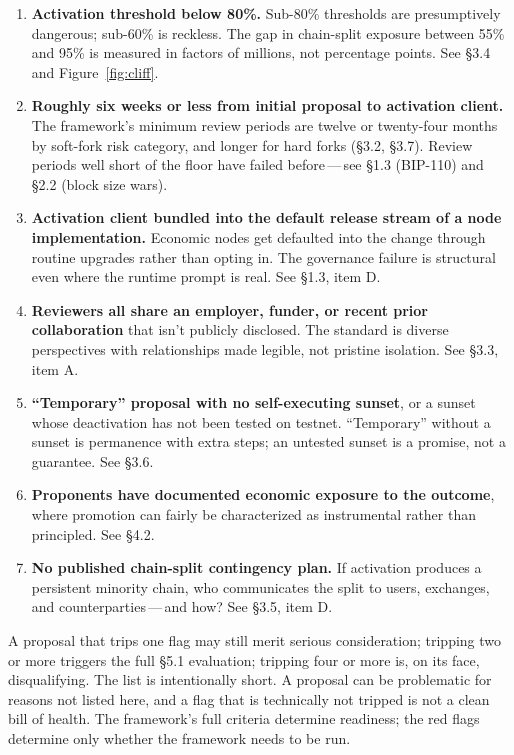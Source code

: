 \documentclass[11pt, twoside, openright]{book}
\newcommand{\sect}[1]{\S#1}
\begin{document}
\begin{enumerate}
  \item \textbf{Activation threshold below 80\%.} Sub-80\% thresholds are presumptively dangerous; sub-60\% is reckless. The gap in chain-split exposure between 55\% and 95\% is measured in factors of millions, not percentage points. See \sect{3.4} and Figure~\ref{fig:cliff}.
  \item \textbf{Roughly six weeks or less from initial proposal to activation client.} The framework's minimum review periods are twelve or twenty-four months by soft-fork risk category, and longer for hard forks (\sect{3.2}, \sect{3.7}). Review periods well short of the floor have failed before\,---\,see \sect{1.3} (BIP-110) and \sect{2.2} (block size wars).
  \item \textbf{Activation client bundled into the default release stream of a node implementation.} Economic nodes get defaulted into the change through routine upgrades rather than opting in. The governance failure is structural even where the runtime prompt is real. See \sect{1.3}, item D.
  \item \textbf{Reviewers all share an employer, funder, or recent prior collaboration} that isn't publicly disclosed. The standard is diverse perspectives with relationships made legible, not pristine isolation. See \sect{3.3}, item A.
  \item \textbf{``Temporary'' proposal with no self-executing sunset}, or a sunset whose deactivation has not been tested on testnet. ``Temporary'' without a sunset is permanence with extra steps; an untested sunset is a promise, not a guarantee. See \sect{3.6}.
  \item \textbf{Proponents have documented economic exposure to the outcome}, where promotion can fairly be characterized as instrumental rather than principled. See \sect{4.2}.
  \item \textbf{No published chain-split contingency plan.} If activation produces a persistent minority chain, who communicates the split to users, exchanges, and counterparties\,---\,and how? See \sect{3.5}, item D.
\end{enumerate}

A proposal that trips one flag may still merit serious consideration; tripping two or more triggers the full \sect{5.1} evaluation; tripping four or more is, on its face, disqualifying. The list is intentionally short. A proposal can be problematic for reasons not listed here, and a flag that is technically not tripped is not a clean bill of health. The framework's full criteria determine readiness; the red flags determine only whether the framework needs to be run.
\end{document}
